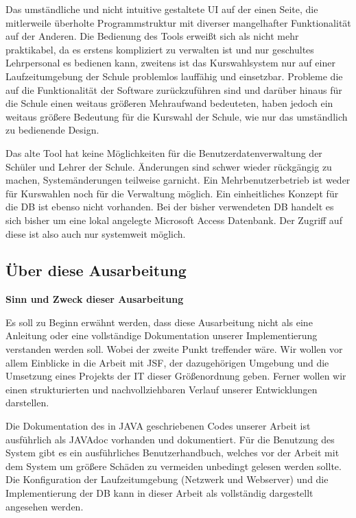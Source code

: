 \documentclass[12pt, twoside, a4paper, ngerman]{article}
\begin{document}
Das umständliche und nicht intuitive gestaltete \ac{UI} auf der einen Seite, die mitlerweile überholte Programmstruktur mit diverser mangelhafter Funktionalität auf der Anderen.
Die Bedienung des Tools erweißt sich als nicht mehr praktikabel, da es erstens kompliziert zu verwalten ist und nur geschultes Lehrpersonal es bedienen kann, zweitens ist das Kurswahlsystem nur auf einer Laufzeitumgebung der Schule problemlos lauffähig und einsetzbar.
Probleme die auf die Funktionalität der Software zurückzuführen sind und darüber hinaus für die Schule einen weitaus größeren Mehraufwand bedeuteten, haben jedoch ein weitaus größere Bedeutung für die Kurswahl der Schule, wie nur das umständlich zu bedienende Design.

Das alte Tool hat keine Möglichkeiten für die Benutzerdatenverwaltung der Schüler und Lehrer der Schule. Änderungen sind schwer wieder rückgängig zu machen, Systemänderungen teilweise garnicht.
Ein Mehrbenutzerbetrieb ist weder für Kurswahlen noch für die Verwaltung möglich.
Ein einheitliches Konzept für die \ac{DB} ist ebenso nicht vorhanden.
Bei der bisher verwendeten \ac{DB} handelt es sich bisher um eine lokal angelegte \gls{Microsoft Access Datenbank}. Der Zugriff auf diese ist also auch nur systemweit möglich.

\subsection{Über diese Ausarbeitung}\label{subsec:Uber diese Ausarbeitung}

\textbf{Sinn und Zweck dieser Ausarbeitung}

Es soll zu Beginn erwähnt werden, dass diese Ausarbeitung nicht als eine Anleitung oder eine vollständige Dokumentation unserer Implementierung verstanden werden soll. Wobei der zweite Punkt treffender wäre. Wir wollen vor allem Einblicke in die Arbeit mit \ac{JSF}, der dazugehörigen Umgebung und die Umsetzung eines Projekts der \ac{IT} dieser Größenordnung geben. Ferner wollen wir einen strukturierten und nachvollziehbaren Verlauf unserer Entwicklungen darstellen.

Die Dokumentation des in \gls{JAVA} geschriebenen Codes unserer Arbeit ist ausführlich als \gls{JAVAdoc} vorhanden und dokumentiert. Für die Benutzung des System gibt es ein ausführliches Benutzerhandbuch, welches vor der Arbeit mit dem System um größere Schäden zu vermeiden unbedingt gelesen werden sollte. Die Konfiguration der Laufzeitumgebung (Netzwerk und Webserver) und die Implementierung der \ac{DB} kann in dieser Arbeit als vollständig dargestellt angesehen werden.
\end{document}
